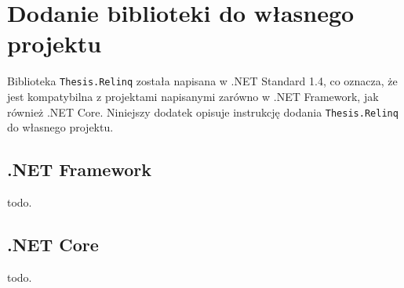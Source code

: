 \chapter{Dodanie biblioteki do własnego projektu}
Biblioteka \texttt{Thesis.Relinq} została napisana w .NET Standard 1.4, co oznacza, że jest kompatybilna z projektami napisanymi zarówno w .NET Framework, jak również .NET Core. Niniejszy dodatek opisuje instrukcję dodania \texttt{Thesis.Relinq} do własnego projektu.

\section{.NET Framework}
todo.

\section{.NET Core}
todo.